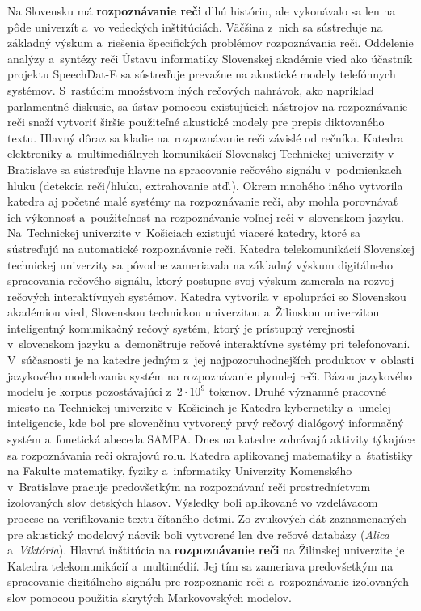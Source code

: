\begin{multicols}{2}
Na Slovensku má \textbf{rozpoznávanie reči} dlhú históriu, ale vykonávalo sa len na pôde univerzít a~vo vedeckých inštitúciách. Väčšina z~nich sa sústreďuje na základný výskum a~riešenia špecifických problémov rozpoznávania reči. Oddelenie analýzy a~syntézy reči Ústavu informatiky Slovenskej akadémie vied ako účastník projektu SpeechDat-E sa sústreďuje prevažne na akustické modely telefónnych systémov. S~rastúcim množstvom iných rečových nahrávok, ako napríklad parlamentné diskusie, sa ústav pomocou existujúcich nástrojov na rozpoznávanie reči snaží vytvoriť širšie použiteľné akustické modely pre  prepis diktovaného textu. Hlavný dôraz sa kladie na~rozpoznávanie reči závislé od rečníka. Katedra elektroniky a~multimediálnych komunikácií Slovenskej Technickej univerzity v Bratislave sa sústreďuje hlavne na spracovanie rečového signálu v~podmienkach hluku (detekcia reči/hluku, extrahovanie atď.). Okrem mnohého iného vytvorila katedra aj početné malé systémy na rozpoznávanie reči, aby mohla porovnávať ich výkonnosť a~použiteľnosť na rozpoznávanie voľnej reči v~slovenskom jazyku. Na~Technickej univerzite v~Košiciach existujú viaceré katedry, ktoré sa sústreďujú na automatické rozpoznávanie reči. Katedra telekomunikácií Slovenskej technickej univerzity sa pôvodne zameriavala na základný výskum digitálneho spracovania rečového signálu, ktorý postupne svoj výskum zamerala na rozvoj rečových interaktívnych systémov.
\newline Katedra vytvorila v~spolupráci so Slovenskou akadémiou vied, Slovenskou technickou univerzitou a~Žilinskou univerzitou inteligentný komunikačný rečový systém, ktorý je prístupný verejnosti v~slovenskom jazyku a~demonštruje rečové interaktívne systémy pri telefonovaní. V~súčasnosti je na katedre jedným z~jej najpozoruhodnejších produktov v~oblasti jazykového modelovania systém na rozpoznávanie plynulej reči. Bázou jazykového modelu  je korpus pozostávajúci z~$2\cdot 10^9$ tokenov. 
\newline Druhé významné pracovné miesto na Technickej univerzite v~Košiciach je Katedra kybernetiky a~umelej inteligencie, kde bol pre slovenčinu vytvorený prvý rečový dialógový informačný systém a~fonetická abeceda SAMPA. Dnes na katedre zohrávajú aktivity týkajúce sa rozpoznávania reči okrajovú rolu. Katedra aplikovanej matematiky a~štatistiky na Fakulte matematiky, fyziky a~informatiky Univerzity Komenského v~Bratislave pracuje predovšetkým na rozpoznávaní reči prostredníctvom izolovaných slov detských hlasov. Výsledky boli aplikované vo vzdelávacom procese na verifikovanie textu čítaného deťmi. Zo zvukových dát zaznamenaných pre akustický modelový nácvik boli vytvorené len dve rečové databázy (\emph{Alica} a~\emph{Viktória}).  Hlavná inštitúcia na \textbf{rozpoznávanie reči} na Žilinskej univerzite je Katedra telekomunikácií a~multimédií. Jej tím sa zameriava predovšetkým na spracovanie digitálneho signálu pre rozpoznanie reči a~rozpoznávanie izolovaných slov pomocou použitia skrytých Markovovských modelov.


\end{multicols}
